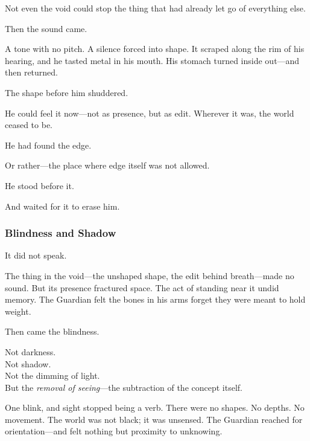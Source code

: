 \documentclass[12pt]{article}
\begin{document}
\vspace{0.5em}
Not even the void could stop the thing that had already let go of everything else.

\vspace{0.5em}
Then the sound came.

\vspace{0.5em}
A tone with no pitch. A silence forced into shape. It scraped along the rim of his hearing, and he tasted metal in his mouth. His stomach turned inside out---and then returned.

\vspace{0.5em}
The shape before him shuddered.

\vspace{0.5em}
He could feel it now---not as presence, but as edit. Wherever it was, the world ceased to be.

\vspace{0.5em}
He had found the edge.

\vspace{0.5em}
Or rather---the place where edge itself was not allowed.

\vspace{0.5em}
He stood before it.

\vspace{0.5em}
And waited for it to erase him.

\dotfill

\subsubsection*{Blindness and Shadow}

It did not speak.

\vspace{0.5em}
The thing in the void---the unshaped shape, the edit behind breath---made no sound. But its presence fractured space. The act of standing near it undid memory. The Guardian felt the bones in his arms forget they were meant to hold weight.

\vspace{0.5em}
Then came the blindness.

\vspace{0.5em}
Not darkness.\\
Not shadow.\\
Not the dimming of light.\\
But the \textit{removal of seeing}---the subtraction of the concept itself.

\vspace{0.5em}
One blink, and sight stopped being a verb. There were no shapes. No depths. No movement. The world was not black; it was unsensed. The Guardian reached for orientation---and felt nothing but proximity to unknowing.
\end{document}
